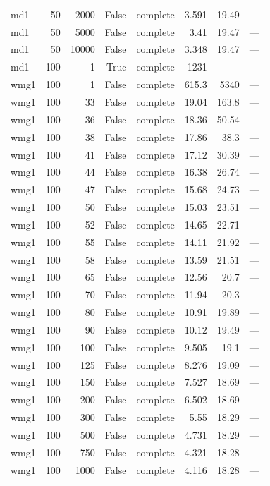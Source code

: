 \begin{tabular}{lrrrlrrl}
md1 & 50 & 2000 & False & complete & 3.591 & 19.49 & — \\
md1 & 50 & 5000 & False & complete & 3.41 & 19.47 & — \\
md1 & 50 & 10000 & False & complete & 3.348 & 19.47 & — \\
md1 & 100 & 1 & True & complete & 1231 & — & — \\
wmg1 & 100 & 1 & False & complete & 615.3 & 5340 & — \\
wmg1 & 100 & 33 & False & complete & 19.04 & 163.8 & — \\
wmg1 & 100 & 36 & False & complete & 18.36 & 50.54 & — \\
wmg1 & 100 & 38 & False & complete & 17.86 & 38.3 & — \\
wmg1 & 100 & 41 & False & complete & 17.12 & 30.39 & — \\
wmg1 & 100 & 44 & False & complete & 16.38 & 26.74 & — \\
wmg1 & 100 & 47 & False & complete & 15.68 & 24.73 & — \\
wmg1 & 100 & 50 & False & complete & 15.03 & 23.51 & — \\
wmg1 & 100 & 52 & False & complete & 14.65 & 22.71 & — \\
wmg1 & 100 & 55 & False & complete & 14.11 & 21.92 & — \\
wmg1 & 100 & 58 & False & complete & 13.59 & 21.51 & — \\
wmg1 & 100 & 65 & False & complete & 12.56 & 20.7 & — \\
wmg1 & 100 & 70 & False & complete & 11.94 & 20.3 & — \\
wmg1 & 100 & 80 & False & complete & 10.91 & 19.89 & — \\
wmg1 & 100 & 90 & False & complete & 10.12 & 19.49 & — \\
wmg1 & 100 & 100 & False & complete & 9.505 & 19.1 & — \\
wmg1 & 100 & 125 & False & complete & 8.276 & 19.09 & — \\
wmg1 & 100 & 150 & False & complete & 7.527 & 18.69 & — \\
wmg1 & 100 & 200 & False & complete & 6.502 & 18.69 & — \\
wmg1 & 100 & 300 & False & complete & 5.55 & 18.29 & — \\
wmg1 & 100 & 500 & False & complete & 4.731 & 18.29 & — \\
wmg1 & 100 & 750 & False & complete & 4.321 & 18.28 & — \\
wmg1 & 100 & 1000 & False & complete & 4.116 & 18.28 & — \\

\end{tabular}
